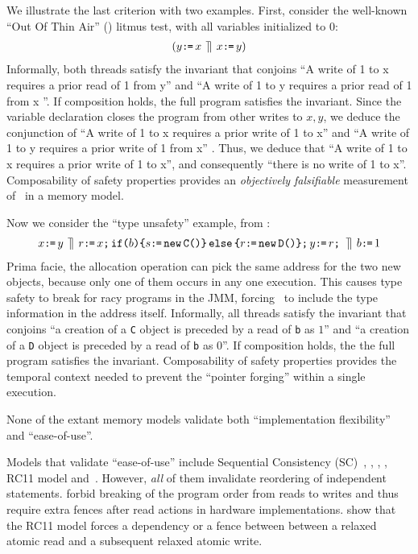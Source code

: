 We illustrate the last criterion with two examples.   
First, consider the well-known ``Out Of Thin Air'' (\oota) litmus test, with all variables initialized to $0$:
\begin{align*}
  (y\texttt{:}\mkern-1mu\texttt{=}\, x \,\mathbin{\rrceil}\, x \texttt{:}\mkern-1mu\texttt{=}\, y)
\end{align*}
Informally, both threads satisfy the invariant that conjoins ``A write of 1  to x  requires a prior read  of 1 from y'' and ``A write of 1  to y  requires a prior read  of 1 from x ''.  If composition holds, the full program satisfies the invariant.  Since the variable declaration closes the program from other writes to $x,y$, we  deduce the conjunction of  ``A write of 1  to x  requires a prior write  of 1 to x'' and ``A write of 1  to y  requires a prior write  of 1 from x'' . Thus, we deduce that ``A write of 1  to x  requires a prior write  of 1 to x'', and consequently ``there is no write of 1 to x''. 
Composability  of safety properties provides an  {\em objectively  falsifiable} measurement of \oota\ in a memory model. 


Now we consider the ``type unsafety'' example, from
\citep[Figure 8]{DBLP:journals/toplas/Lochbihler13}:
\begin{align*}
  x\texttt{:}\mkern-1mu\texttt{=}\, y
  \,\mathbin{\rrceil}\,
  r\texttt{:}\mkern-1mu\texttt{=}\, x \texttt{;}\, \texttt{if}\allowbreak\texttt{(}b\texttt{)} \allowbreak\texttt{\{} s \texttt{:}\mkern-1mu\texttt{=}\, \texttt{new}\, \texttt{C()} \texttt{\}}\,\allowbreak\texttt{else}\allowbreak\,\texttt{\{} r \texttt{:}\mkern-1mu\texttt{=}\, \texttt{new}\, \texttt{D()} \texttt{\}}  \texttt{;}\, y \texttt{:}\mkern-1mu\texttt{=}\, r \texttt{;}\,  
  \,\mathbin{\rrceil}\,
  b \texttt{:}\mkern-1mu\texttt{=}\, 1   
\end{align*}
Prima facie, the allocation operation can pick the same address for the two new objects, because only one of them occurs in any one execution.   This causes type safety to break for racy programs in the JMM, forcing~\citeauthor{DBLP:journals/toplas/Lochbihler13} to include the type information in the address itself.
%
Informally, all threads satisfy the invariant that conjoins ``a creation of a \texttt{C} object is preceded by a read of \texttt{b} as $1$'' and ``a creation of a \texttt{D} object is preceded by a read of \texttt{b} as $0$''.  If composition holds, the the full program satisfies the invariant.   
%
Composability of safety properties provides the temporal context needed to prevent the ``pointer forging''  within a single execution.  


None of the extant memory models validate both ``implementation flexibility'' and ``ease-of-use''.  

Models that validate ``ease-of-use'' include Sequential Consistency (SC)~\citet{Lamport:1979:MMC:1311099.1311750}, \citet{Dolan:2018:BDR:3192366.3192421}, \citet{DBLP:conf/pldi/LahavVKHD17}, \citet{DBLP:conf/lics/JeffreyR16}, RC11 model\cite{DBLP:conf/pldi/LahavVKHD17} and~\citet{BoehmOOTA}.  However, {\em all} of them invalidate reordering of independent statements.  \cite{Dolan:2018:BDR:3192366.3192421,BoehmOOTA,DBLP:conf/lics/JeffreyR16} forbid breaking of the program order from reads to writes and thus require extra fences after read actions in hardware implementations.  \citet{Boehm:2014:OGA:2618128.2618134} show that the RC11 model\cite{DBLP:conf/pldi/LahavVKHD17} forces a dependency or a fence between between a relaxed atomic
read and a subsequent relaxed atomic write.  


